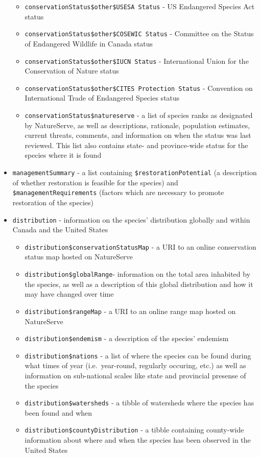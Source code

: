 \documentclass[]{article}
\providecommand{\tightlist}{%
  \setlength{\itemsep}{0pt}\setlength{\parskip}{0pt}}
\begin{document}
\begin{itemize}
  \begin{itemize}
  \tightlist
  \item
    \texttt{conservationStatus\$other\$USESA\ Status} - US Endangered
    Species Act status
  \item
    \texttt{conservationStatus\$other\$COSEWIC\ Status} - Committee on
    the Status of Endangered Wildlife in Canada status
  \item
    \texttt{conservationStatus\$other\$IUCN\ Status} - International
    Union for the Conservation of Nature status
  \item
    \texttt{conservationStatus\$other\$CITES\ Protection\ Status} -
    Convention on International Trade of Endangered Species status
  \item
    \texttt{conservationStatus\$natureserve} - a list of species ranks
    as designated by NatureServe, as well as descriptions, rationale,
    population estimates, current threats, comments, and information on
    when the status was last reviewed. This list also contains state-
    and province-wide status for the species where it is found
  \end{itemize}
\item
  \texttt{managementSummary} - a list containing
  \texttt{\$restorationPotential} (a description of whether restoration
  is feasible for the species) and \texttt{\$managementRequirements}
  (factors which are necessary to promote restoration of the species)
\item
  \texttt{distribution} - information on the species' distribution
  globally and within Canada and the United States

  \begin{itemize}
  \tightlist
  \item
    \texttt{distribution\$conservationStatusMap} - a URI to an online
    conservation status map hosted on NatureServe
  \item
    \texttt{distribution\$globalRange}- information on the total area
    inhabited by the species, as well as a description of this global
    distribution and how it may have changed over time
  \item
    \texttt{distribution\$rangeMap} - a URI to an online range map
    hosted on NatureServe
  \item
    \texttt{distribution\$endemism} - a description of the species'
    endemism
  \item
    \texttt{distribution\$nations} - a list of where the species can be
    found during what times of year (i.e.~year-round, regularly
    occuring, etc.) as well as information on sub-national scales like
    state and provincial presense of the species
  \item
    \texttt{distribution\$watersheds} - a tibble of watersheds where the
    species has been found and when
  \item
    \texttt{distribution\$countyDistribution} - a tibble containing
    county-wide information about where and when the species has been
    observed in the United States
  \end{itemize}
\end{itemize}
\end{document}
